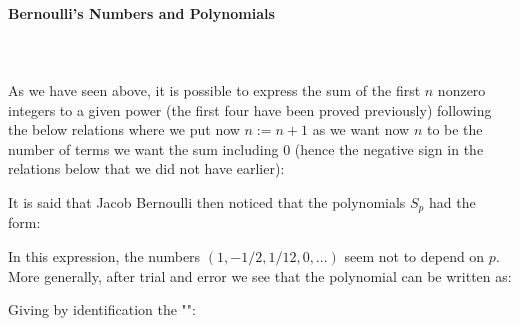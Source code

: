 	\paragraph{Bernoulli's Numbers and Polynomials}\mbox{}\\\\
	As we have seen above, it is possible to express the sum of the first $n$ nonzero integers to a given power (the first four have been proved previously) following the below relations where we put now $n:=n+1$ as we want now $n$ to be the number of terms we want the sum including 0 (hence the negative sign in the relations below that we did not have earlier):
	
	It is said that Jacob Bernoulli  then noticed that the polynomials $S_p$ had the form:
	
	In this expression, the numbers $(1,-1/2,1/12,0,...)$ seem not to depend on $p$. More generally, after trial and error we see that the polynomial can be written as:
	
	Giving by identification the "":
	
